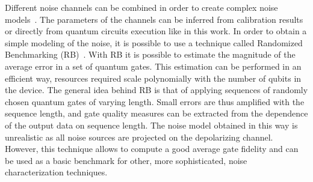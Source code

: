 \documentclass[sn-basic]{sn-jnl} %
\begin{document}
\noindent
Different noise channels can be combined in order to create complex noise models~\cite{PhysRevA.104.062432, article_model_realistic}. 
The parameters of the channels can be inferred from calibration results or directly from quantum circuits execution like in this work.
In order to obtain a simple modeling of the noise, it is possible to use a technique called Randomized Benchmarking 
(RB)~\cite{Emerson_2005, heinrich2023randomized, 2019npj}.
With RB it is possible to estimate the magnitude of the average error in a set of quantum gates. 
This estimation can be performed in an efficient way, resources required scale polynomially with the number of qubits in the device. 
The general idea behind RB is that of applying sequences of randomly chosen quantum gates of varying length. 
Small errors are thus amplified with the sequence length, and gate quality measures can be extracted from the dependence of the output data on sequence length.
The noise model obtained in this way is unrealistic as all noise sources are projected on the depolarizing channel. 
However, this technique allows to compute a good average gate fidelity and can be used as a basic benchmark for other, more sophisticated, 
noise characterization techniques.



    
\end{document}

